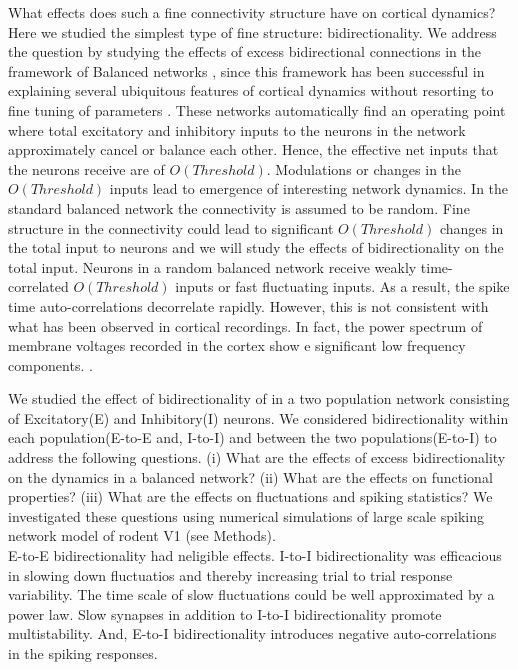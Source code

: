 What effects does such a fine connectivity structure have on cortical dynamics? Here we studied the simplest type of fine structure: bidirectionality. We address the question by studying the effects of excess bidirectional connections in the framework of Balanced networks \cite{carl1996, carl1998, carl2004}, since this framework has been successful in explaining several ubiquitous features of cortical dynamics without resorting to fine tuning of parameters \cite{softky1993, Holt1996, roxin2011}. These networks automatically find an operating point where total excitatory and inhibitory inputs to the neurons in the network approximately cancel or balance each other.  Hence, the effective net inputs that the neurons receive are of $O(Threshold)$. Modulations or changes in the $O(Threshold)$ inputs lead to emergence of interesting network dynamics. In the standard balanced network the connectivity is assumed to be random. Fine structure in the connectivity could lead to significant $O(Threshold)$ changes in the total input to neurons and we will study the effects of bidirectionality on the total input. Neurons in a random balanced network receive weakly time-correlated $O(Threshold)$ inputs or fast fluctuating inputs. As a result, the spike time auto-correlations decorrelate rapidly\cite{carl1996, carl1998}.  However, this is not consistent with what has been observed in cortical recordings. In fact, the power spectrum of membrane voltages recorded in the cortex show e significant low frequency components. \cite{Tan2014}. 						

We studied the effect of bidirectionality of in a two population network consisting of Excitatory(E) and Inhibitory(I) neurons. We considered bidirectionality within each population(E-to-E and, I-to-I) and between the two populations(E-to-I) to address the following questions. (i) What are the effects of excess bidirectionality on the dynamics in a balanced network? (ii) What are the effects on functional properties? (iii) What are the effects on fluctuations and spiking statistics?
We investigated these questions using numerical simulations of large scale spiking network  model of rodent V1 (see Methods). \\
 
 E-to-E bidirectionality had neligible effects. I-to-I bidirectionality was efficacious in slowing down fluctuatios and thereby increasing trial to trial response variability. The time scale of slow fluctuations could be well approximated by a power law. Slow synapses in addition to I-to-I bidirectionality promote multistability. And, E-to-I bidirectionality introduces negative auto-correlations in the spiking responses. 

